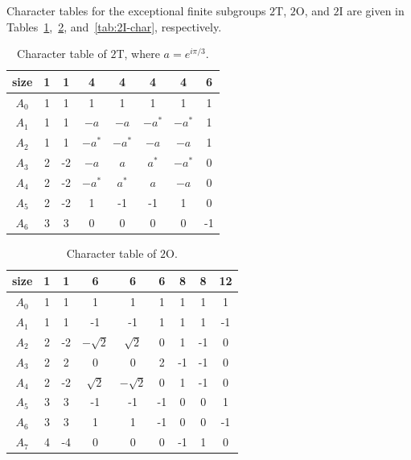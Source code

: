 \documentclass[8pt]{article}
\theoremstyle{definition}
\begin{document}
Character tables for the exceptional finite subgroups \(2\mathrm{T}\), \(2\mathrm{O}\), and \(2\mathrm{I}\) are given in Tables~\ref{tab:2T-char},~\ref{tab:2O-char}, and~\ref{tab:2I-char}, respectively.

\begin{table}[h]
    \centering
    \renewcommand{\arraystretch}{1.2}
    \begin{tabular}{c|ccccccc}
        \hline
        size    & 1 & 1  & 4      & 4      & 4      & 4      & 6  \\
        \hline
        $A_{0}$ & 1 & 1  & 1      & 1      & 1      & 1      & 1  \\
        $A_{1}$ & 1 & 1  & $-a$   & $-a$   & $-a^*$ & $-a^*$ & 1  \\
        $A_{2}$ & 1 & 1  & $-a^*$ & $-a^*$ & $-a$   & $-a$   & 1  \\
        $A_{3}$ & 2 & -2 & $-a$   & $a$    & $a^*$  & $-a^*$ & 0  \\
        $A_{4}$ & 2 & -2 & $-a^*$ & $a^*$  & $a$    & $-a$   & 0  \\
        $A_{5}$ & 2 & -2 & 1      & -1     & -1     & 1      & 0  \\
        $A_{6}$ & 3 & 3  & 0      & 0      & 0      & 0      & -1 \\
        \hline
    \end{tabular}
    \caption{\label{tab:2T-char}Character table of \(2\mathrm{T}\), where \(a = e^{i\pi/3}\).}
\end{table}

\begin{table}[h]
    \centering
    \renewcommand{\arraystretch}{1.2}
    \begin{tabular}{c|cccccccc}
        \hline
        size    & 1 & 1  & 6           & 6           & 6  & 8  & 8  & 12 \\
        \hline
        $A_{0}$ & 1 & 1  & 1           & 1           & 1  & 1  & 1  & 1  \\
        $A_{1}$ & 1 & 1  & -1          & -1          & 1  & 1  & 1  & -1 \\
        $A_{2}$ & 2 & -2 & $-\sqrt{2}$ & $\sqrt{2}$  & 0  & 1  & -1 & 0  \\
        $A_{3}$ & 2 & 2  & 0           & 0           & 2  & -1 & -1 & 0  \\
        $A_{4}$ & 2 & -2 & $\sqrt{2}$  & $-\sqrt{2}$ & 0  & 1  & -1 & 0  \\
        $A_{5}$ & 3 & 3  & -1          & -1          & -1 & 0  & 0  & 1  \\
        $A_{6}$ & 3 & 3  & 1           & 1           & -1 & 0  & 0  & -1 \\
        $A_{7}$ & 4 & -4 & 0           & 0           & 0  & -1 & 1  & 0  \\
        \hline
    \end{tabular}
    \caption{\label{tab:2O-char}Character table of \(2\mathrm{O}\).}
\end{table}
\end{document}
